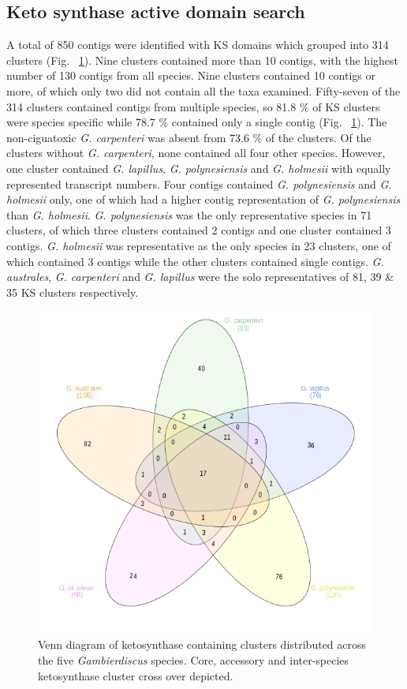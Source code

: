 \documentclass[12pt]{article}
\begin{document}
\subsection{Keto synthase active domain search}
\FloatBarrier
A total of 850 contigs were identified with KS domains which grouped into 314 clusters (Fig. ~\ref{fig:KSVenn}). 
Nine clusters contained more than 10 contigs, with the highest number of 130 contigs from all species.
Nine clusters contained 10 contigs or more, of which only two did not contain all the taxa examined.
Fifty-seven of the 314 clusters contained contigs from multiple species, so 81.8 \% of KS clusters were species specific while 78.7 \% contained only a single contig (Fig. ~\ref{fig:KSVenn}). 
The non-ciguatoxic \textit{G. carpenteri} was absent from 73.6 \% of the clusters. 
Of the clusters without \textit{G. carpenteri}, none contained all four other species. 
However, one cluster contained \textit{G. lapillus}, \textit{G. polynesiensis} and \emph{G. holmesii} with equally represented transcript numbers. 
Four contigs contained \textit{G. polynesiensis} and \emph{G. holmesii} only, one of which had a higher contig representation of \textit{G. polynesiensis} than \emph{G. holmesii}. 
\textit{G. polynesiensis} was the only representative species in 71 clusters, of which three clusters contained 2 contigs and one cluster contained 3 contigs. 
\emph{G. holmesii} was representative as the only species in 23 clusters, one of which contained 3 contigs while the other clusters contained single contigs.
\textit{G. australes}, \textit{G. carpenteri} and \textit{G. lapillus} were the solo representatives of 81, 39 \& 35 KS clusters respectively. \\
\begin{figure} 
\includegraphics[scale=1]{3Aug18_cluster-investigation/pks/KS-venn.png} 
\caption{Venn diagram of ketosynthase containing clusters distributed across the five \textit{Gambierdiscus} species. Core, accessory and inter-species  ketosynthase cluster cross over depicted.} 
\label{fig:KSVenn}
\end{figure} 
\FloatBarrier
\end{document}
